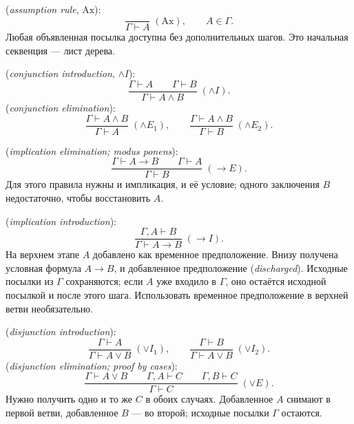  (\emph{assumption rule}, \(\mathrm{Ax}\)):
\[
\frac{}{\Gamma\vdash A}\;(\mathrm{Ax}),\qquad A\in\Gamma.
\]
Любая объявленная посылка доступна без дополнительных шагов. Это начальная секвенция — лист дерева.

 (\emph{conjunction introduction}, \(\land I\)):
\[
\frac{\Gamma\vdash A\qquad\Gamma\vdash B}{\Gamma\vdash A\land B}\;(\land I).
\]
 (\emph{conjunction elimination}):
\[
\frac{\Gamma\vdash A\land B}{\Gamma\vdash A}\;(\land E_1),
\qquad
\frac{\Gamma\vdash A\land B}{\Gamma\vdash B}\;(\land E_2).
\]

 (\emph{implication elimination; modus ponens}):
\[
\frac{\Gamma\vdash A\to B\qquad\Gamma\vdash A}{\Gamma\vdash B}\;(\to E).
\]
Для этого правила нужны и импликация, и её условие; одного заключения \(B\) недостаточно, чтобы восстановить \(A\).

 (\emph{implication introduction}):
\[
\frac{\Gamma,A\vdash B}{\Gamma\vdash A\to B}\;(\to I).
\]
На верхнем этапе \(A\) добавлено как временное предположение. Внизу получена условная формула \(A\to B\), и добавленное предположение  (\emph{discharged}). Исходные посылки из \(\Gamma\) сохраняются; если \(A\) уже входило в \(\Gamma\), оно остаётся исходной посылкой и после этого шага. Использовать временное предположение в верхней ветви необязательно.

 (\emph{disjunction introduction}):
\[
\frac{\Gamma\vdash A}{\Gamma\vdash A\lor B}\;(\lor I_1),
\qquad
\frac{\Gamma\vdash B}{\Gamma\vdash A\lor B}\;(\lor I_2).
\]
 (\emph{disjunction elimination; proof by cases}):
\[
\frac{\Gamma\vdash A\lor B\qquad
      \Gamma,A\vdash C\qquad
      \Gamma,B\vdash C}
     {\Gamma\vdash C}\;(\lor E).
\]
Нужно получить одно и то же \(C\) в обоих случаях. Добавленное \(A\) снимают в первой ветви, добавленное \(B\) — во второй; исходные посылки \(\Gamma\) остаются.

